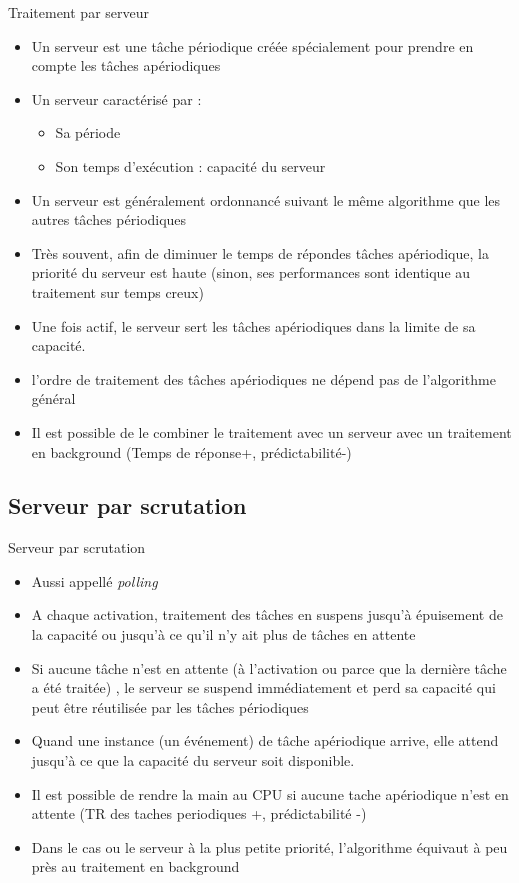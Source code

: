 \begin{frame}{Traitement par serveur} 
  \begin{itemize}
  \item Un  serveur est une  tâche périodique créée  spécialement pour
    prendre en compte les tâches apériodiques
  \item Un serveur caractérisé par :
    \begin{itemize}
    \item Sa période 
    \item Son temps d'exécution : capacité du serveur  
    \end{itemize}
  \item Un serveur est généralement ordonnancé suivant  le même algorithme
    que les autres tâches périodiques
  \item Très  souvent, afin  de diminuer le  temps de  répondes tâches
    apériodique,  la  priorité  du   serveur  est  haute  (sinon,  ses
    performances sont identique au traitement sur temps creux)
  \item Une fois actif, le serveur sert les tâches apériodiques dans
    la limite de sa capacité.
  \item l'ordre de traitement  des tâches apériodiques ne dépend pas
    de l'algorithme général
  \item Il est  possible de le combiner le  traitement avec un serveur
    avec   un   traitement   en   background   (Temps   de   réponse+,
    prédictabilité-)
  \end{itemize}
\end{frame}

\subsection{Serveur par scrutation}

\begin{frame}{Serveur par scrutation}
  \begin{itemize}
  \item Aussi appellé \emph{polling}
  \item A chaque activation,  traitement des tâches en suspens jusqu'à
    épuisement  de la capacité  ou jusqu'à  ce qu'il  n'y ait  plus de
    tâches en attente
  \item Si aucune tâche n'est  en attente (à l'activation ou parce que
    la  dernière  tâche  a  été  traitée)  ,  le  serveur  se  suspend
    immédiatement et perd sa capacité qui peut être réutilisée par les
    tâches périodiques
  \item Quand une instance (un événement) de tâche apériodique arrive,
    elle attend jusqu’à ce que la capacité du serveur soit disponible.
  \item  Il est  possible de  rendre la  main au  CPU si  aucune tache
    apériodique  n'est  en  attente  (TR  des  taches  periodiques  +,
    prédictabilité -)
  \item  Dans  le  cas  ou  le  serveur à  la  plus  petite  priorité,
    l'algorithme équivaut à peu près au traitement en background
  \end{itemize}
\end{frame} 

